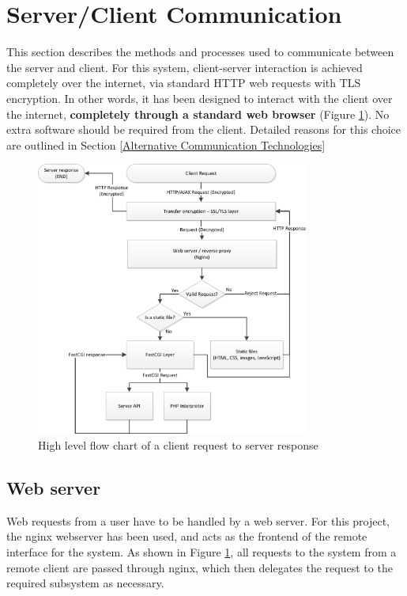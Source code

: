 

\section{Server/Client Communication}\label{Server/Client Communication}


This section describes the methods and processes used to communicate between the server and client. For this system, client-server interaction is achieved completely over the internet, via standard HTTP web requests with TLS encryption. In other words, it has been designed to interact with the client over the internet, {\bf completely through a standard web browser} (Figure \ref{client_request_flowchart.png}). No extra software should be required from the client. Detailed reasons for this choice are outlined in Section \ref{Alternative Communication Technologies}

\begin{figure}[H]
	\centering
	\includegraphics[width=0.8\textwidth]{figures/client_request_flowchart.png}
	\caption{High level flow chart of a client request to server response} 
	\label{client_request_flowchart.png}
\end{figure}

\subsection{Web server}

Web requests from a user have to be handled by a web server. For this project, the nginx\cite{nginx} webserver has been used, and acts as the frontend of the remote interface for the system. As shown in Figure \ref{client_request_flowchart.png}, all requests to the system from a remote client are passed through nginx, which then delegates the request to the required subsystem as necessary. 

